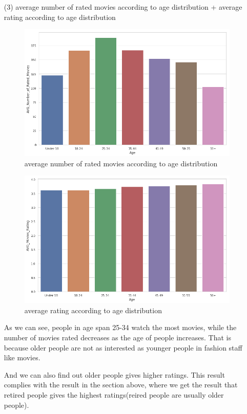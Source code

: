 \documentclass[two column]{article}
\begin{document}
\begin{itemize}
\item[(3)] average number of rated movies according to age distribution + average rating according to age distribution

\begin{figure}[H]
\centering
\caption{average number of rated movies according to age distribution}
\includegraphics[width = 0.95\linewidth]{age-dis-ave-rated-number-and-ave-rating2.png}
\end{figure}

\begin{figure}[H]
\centering
\caption{average rating according to age distribution}
\includegraphics[width = 0.95\linewidth]{age-dis-ave-rated-number-and-ave-rating3.png}
\end{figure}

\par As we can see, people in age span 25-34 watch the most movies, while the number of movies rated decreases as the age of people increases. That is because older people are not as interested as younger people in fashion staff like movies. \par And we can also find out older people gives higher ratings. This result complies with the result in the section above, where we get the result that retired people gives the highest ratings(reired people are usually older people).



\end{itemize}
\end{document}
